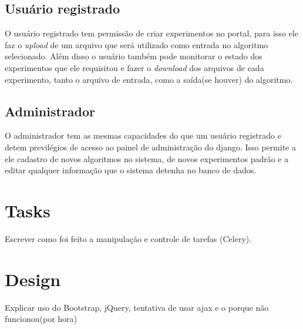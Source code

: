 \documentclass[tg]{mdtufsm}
\begin{document}
\subsection{Usuário registrado}
O usuário registrado tem permissão de criar experimentos no portal, para isso ele faz o \emph{upload} de um arquivo que será utilizado como entrada no algoritmo selecionado. Além disso o usuário também pode monitorar o estado dos experimentos que ele requisitou e fazer o \emph{download} dos arquivos de cada experimento, tanto o arquivo de entrada, como a saída(se houver) do algoritmo.
\subsection{Administrador}
O administrador tem as mesmas capacidades do que um usuário registrado e detem previlégios de acesso ao painel de administração do django. Isso permite a ele cadastro de novos algoritmos no sistema, de novos experimentos padrão e a editar qualquer informação que o sistema detenha no banco de dados.
\section{Tasks}
Escrever como foi feito a manipulação e controle de tarefas (Celery).
\section{Design}
Explicar uso do Bootstrap,
jQuery,
tentativa de usar ajax e o porque não funcionou(por hora)

\iffalse
\end{document}
